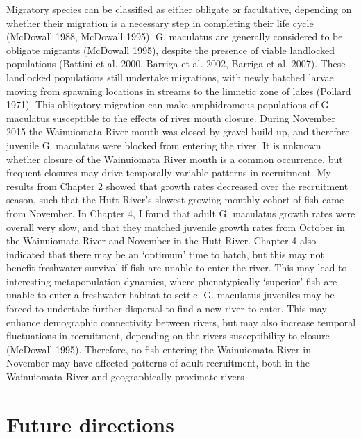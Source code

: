 \documentclass[]{book}
\begin{document}
Migratory species can be classified as either obligate or facultative,
depending on whether their migration is a necessary step in completing
their life cycle (McDowall 1988, McDowall 1995). G. maculatus are
generally considered to be obligate migrants (McDowall 1995), despite
the presence of viable landlocked populations (Battini et al. 2000,
Barriga et al. 2002, Barriga et al. 2007). These landlocked populations
still undertake migrations, with newly hatched larvae moving from
spawning locations in streams to the limnetic zone of lakes (Pollard
1971). This obligatory migration can make amphidromous populations of G.
maculatus susceptible to the effects of river mouth closure. During
November 2015 the Wainuiomata River mouth was closed by gravel build-up,
and therefore juvenile G. maculatus were blocked from entering the
river. It is unknown whether closure of the Wainuiomata River mouth is a
common occurrence, but frequent closures may drive temporally variable
patterns in recruitment. My results from Chapter 2 showed that growth
rates decreased over the recruitment season, such that the Hutt River's
slowest growing monthly cohort of fish came from November. In Chapter 4,
I found that adult G. maculatus growth rates were overall very slow, and
that they matched juvenile growth rates from October in the Wainuiomata
River and November in the Hutt River. Chapter 4 also indicated that
there may be an `optimum' time to hatch, but this may not benefit
freshwater survival if fish are unable to enter the river. This may lead
to interesting metapopulation dynamics, where phenotypically `superior'
fish are unable to enter a freshwater habitat to settle. G. maculatus
juveniles may be forced to undertake further dispersal to find a new
river to enter. This may enhance demographic connectivity between
rivers, but may also increase temporal fluctuations in recruitment,
depending on the rivers susceptibility to closure (McDowall 1995).
Therefore, no fish entering the Wainuiomata River in November may have
affected patterns of adult recruitment, both in the Wainuiomata River
and geographically proximate rivers

\section{Future directions}\label{future-directions}
\end{document}
